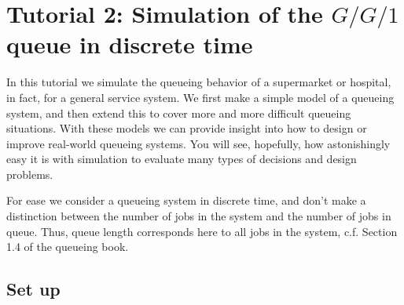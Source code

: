 



\clearpage


\section{Tutorial 2: Simulation of the $G/G/1$ queue in discrete time}
\label{sec:single-server-queue}

In this tutorial we simulate the queueing behavior of a supermarket or hospital, in fact, for a general service system. We first make a simple model of a queueing system, and then extend this to cover more and more difficult queueing situations. With these models we can provide insight into how to design or improve real-world queueing systems.  You will see, hopefully, how astonishingly easy it is with simulation to evaluate many types of decisions and design problems.  

For ease we  consider a queueing system in discrete time, and don't make a distinction between the number of jobs in the system and the number of jobs in queue. Thus, queue length corresponds here to all jobs in the system, c.f. Section 1.4 of the queueing book. 

\subsection{Set up}
\label{sec:set-up}


